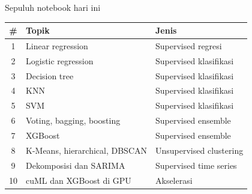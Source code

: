 \documentclass[aspectratio=169,t]{beamer}
\begin{document}

\begin{frame}{Sepuluh notebook hari ini}
  \vspace{0.3em}
  \begin{center}
  {\small\renewcommand{\arraystretch}{1.15}
  \begin{tabular}{@{}cp{5.6cm}p{4.6cm}@{}}
    \toprule
    \rowcolor{nvcard}\color{nvgreen}\textbf{\#} &
    \color{nvgreen}\textbf{Topik} &
    \color{nvgreen}\textbf{Jenis} \\
    \midrule
    1 & Linear regression & Supervised \textperiodcentered{} regresi \\
    \rowcolor{nvcard!60!nvbg} 2 & Logistic regression & Supervised \textperiodcentered{} klasifikasi \\
    3 & Decision tree & Supervised \textperiodcentered{} klasifikasi \\
    \rowcolor{nvcard!60!nvbg} 4 & KNN & Supervised \textperiodcentered{} klasifikasi \\
    5 & SVM & Supervised \textperiodcentered{} klasifikasi \\
    \rowcolor{nvcard!60!nvbg} 6 & Voting, bagging, boosting & Supervised \textperiodcentered{} ensemble \\
    7 & XGBoost & Supervised \textperiodcentered{} ensemble \\
    \rowcolor{nvcard!60!nvbg} 8 & K-Means, hierarchical, DBSCAN & Unsupervised \textperiodcentered{} clustering \\
    9 & Dekomposisi dan SARIMA & Supervised \textperiodcentered{} time series \\
    \rowcolor{nvcard!60!nvbg} 10 & cuML dan XGBoost di GPU & Akselerasi \\
    \bottomrule
  \end{tabular}}
  \end{center}
\end{frame}
\end{document}
